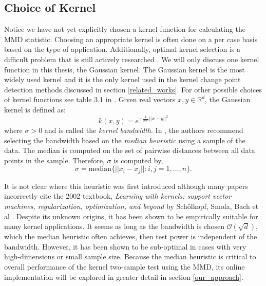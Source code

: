 \subsection{Choice of Kernel}
\label{sec: choice_of_kernel}
Notice we have not yet explicitly chosen a kernel function for calculating the MMD statistic. Choosing an appropriate kernel is often done on a per case basis based on the type of application. Additionally, optimal kernel selection is a difficult problem that is still actively researched \cite{fukumizu2009kernel} \cite{gretton2012optimal}. We will only discuss one kernel function in this thesis, the Gaussian kernel. The Gaussian kernel is the most widely used kernel and it is the only kernel used in the kernel change point detection methods discussed in section \ref{related_works}.  For other possible choices of kernel functions see table 3.1 in \cite{muandet2017kernel}.
Given real vectors $x, y \in \mathbb{R}^d$, the Gaussian kernel is defined as:
\begin{equation}
\label{gauss_kernel}
k(x, y)= e^{-\frac{1}{2\sigma^2}||x-y||^2}
\end{equation}
where $\sigma > 0$ and is called the \textit{kernel bandwidth}. In \cite{gretton2005kernel}, the authors recommend selecting the bandwidth based on the \textit{median heuristic} using a sample of the data. The median is computed on the set of pairwise distances between all data points in the sample. Therefore, $\sigma$ is computed by, 
\begin{equation}
\label{median_heuristic}
\sigma=\text{median}\{||x_i-x_j||:i,j = 1,...,n \}.
\end{equation}

It is not clear where this heuristic was first introduced although many papers incorrectly cite the 2002 textbook, \textit{Learning with kernels: support vector machines, regularization, optimization, and beyond} by Sch{\"o}lkopf, Smola, Bach et al \cite{garreau2017large}. Despite its unknown origins, it has been shown to be empirically suitable for many kernel applications. It seems as long as the bandwidth is chosen $\mathcal{O}(\sqrt{d})$, which the median heuristic often achieves, then test power is independent of the bandwidth. However, it has been shown to be sub-optimal in cases with very high-dimensions \cite{muandet2014kernel} or small sample size\cite{ramdas2015decreasing}. Because the median heuristic is critical to overall performance of the kernel two-sample test using the MMD, its online implementation will be explored in greater detail in section \ref{our_approach}.
 
